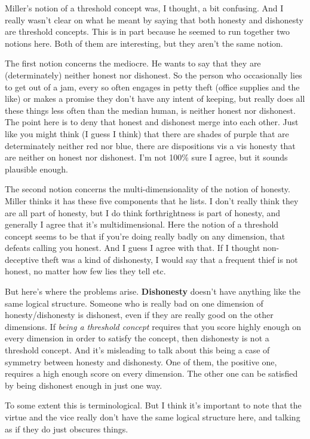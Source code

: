 \documentclass[
]{article}
\begin{document}
Miller's notion of a threshold concept was, I thought, a bit confusing.
And I really wasn't clear on what he meant by saying that both honesty
and dishonesty are threshold concepts. This is in part because he seemed
to run together two notions here. Both of them are interesting, but they
aren't the same notion.

The first notion concerns the mediocre. He wants to say that they are
(determinately) neither honest nor dishonest. So the person who
occasionally lies to get out of a jam, every so often engages in petty
theft (office supplies and the like) or makes a promise they don't have
any intent of keeping, but really does all these things less often than
the median human, is neither honest nor dishonest. The point here is to
deny that honest and dishonest merge into each other. Just like you
might think (I guess I think) that there are shades of purple that are
determinately neither red nor blue, there are dispositions vis a vis
honesty that are neither on honest nor dishonest. I'm not 100\% sure I
agree, but it sounds plausible enough.

The second notion concerns the multi-dimensionality of the notion of
honesty. Miller thinks it has these five components that he lists. I
don't really think they are all part of honesty, but I do think
forthrightness is part of honesty, and generally I agree that it's
multidimensional. Here the notion of a threshold concept seems to be
that if you're doing really badly on any dimension, that defeats calling
you honest. And I guess I agree with that. If I thought non-deceptive
theft was a kind of dishonesty, I would say that a frequent thief is not
honest, no matter how few lies they tell etc.

But here's where the problems arise. \textbf{Dishonesty} doesn't have
anything like the same logical structure. Someone who is really bad on
one dimension of honesty/dishonesty is dishonest, even if they are
really good on the other dimensions. If \emph{being a threshold concept}
requires that you score highly enough on every dimension in order to
satisfy the concept, then dishonesty is not a threshold concept. And
it's misleading to talk about this being a case of symmetry between
honesty and dishonesty. One of them, the positive one, requires a high
enough score on every dimension. The other one can be satisfied by being
dishonest enough in just one way.

To some extent this is terminological. But I think it's important to
note that the virtue and the vice really don't have the same logical
structure here, and talking as if they do just obscures things.
\end{document}
